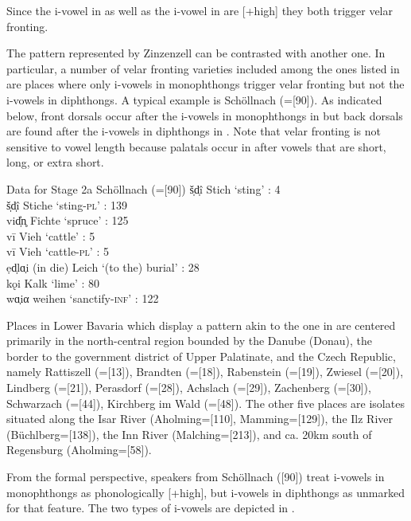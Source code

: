 Since the i-vowel in  as well as the i-vowel in  are [+high] they both trigger velar fronting.

The pattern represented by Zinzenzell can be contrasted with another one. In particular, a number of velar fronting varieties included among the ones listed in  are places where only i-vowels in monophthongs trigger velar fronting but not the i-vowels in diphthongs. A typical example is Schöllnach (=[90]). As indicated below, front dorsals occur after the i-vowels in monophthongs in  but back dorsals are found after the i-vowels in diphthongs in . Note that velar fronting is not sensitive to vowel length because palatals occur in  after vowels that are short, long, or extra short.

\ea%
\label{ex:13:16}Data for Stage 2a Schöllnach (=[90])
\ea\label{ex:13:16a} š̩d̩î \tab Stich  \tab  ‘sting’ : 4\\
    š̩d̩î \tab Stiche  \tab  ‘sting-\textsc{pl}’ : 139\\
    vid̩͐n̥ \tab Fichte  \tab  ‘spruce’ : 125\\
    vī \tab Vieh  \tab  ‘cattle’ : 5\\
    vī \tab Vieh  \tab  ‘cattle-\textsc{pl}’ : 5\\
\ex\label{ex:13:16b} ẹd̩lɑ̣i \tab (in die) Leich \tab ‘(to the) burial’ : 28\\
    kǫi \tab Kalk  \tab  ‘lime’ : 80\\
    wɑ̣iα \tab weihen  \tab  ‘sanctify-\textsc{inf}’ : 122\\
\z
\z 

Places in Lower Bavaria which display a pattern akin to the one in  are centered primarily in the north-central region bounded by the Danube (Donau), the border to the government district of Upper Palatinate, and the Czech Republic, namely  Rattiszell (=[13]), Brandten (=[18]), Rabenstein (=[19]), Zwiesel (=[20]), Lindberg (=[21]), Perasdorf (=[28]), Achslach (=[29]), Zachenberg (=[30]), Schwarzach (=[44]), Kirchberg im Wald (=[48]). The other five places are isolates situated along the Isar River (Aholming=[110], Mamming=[129]), the Ilz River (Büchlberg=[138]), the Inn River (Malching=[213]), and ca. 20km south of Regensburg (Aholming=[58]).

From the formal perspective, speakers from Schöllnach ([90]) treat i-vowels in monophthongs as phonologically [+high], but i-vowels in diphthongs as unmarked for that feature. The two types of i-vowels are depicted in .

